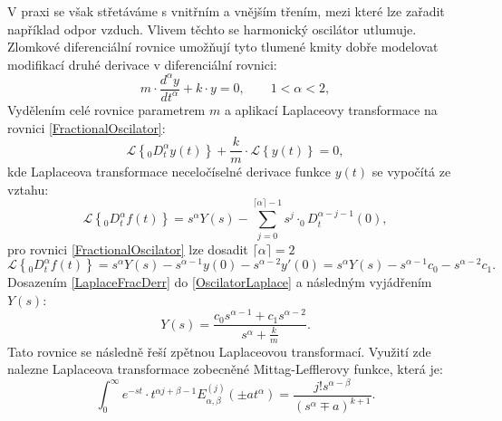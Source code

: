 \documentclass[a4paper,12pt,twoside]{article}
\theoremstyle{definition}
\theoremstyle{remark}
\numberwithin{equation}{section}
\numberwithin{table}{section}
\numberwithin{figure}{section}
\begin{document}
V praxi se však střetáváme s vnitřním a vnějším třením, mezi které lze zařadit například odpor vzduch. Vlivem těchto se harmonický oscilátor utlumuje. Zlomkové diferenciální rovnice umožňují tyto tlumené kmity dobře modelovat modifikací druhé derivace v diferenciální rovnici:
\begin{equation} \label{FractionalOscilator}
	m \cdot \frac{d^{\alpha} y}{d t^{\alpha}} + k \cdot y = 0, \qquad	1 < \alpha <2,
\end{equation}
Vydělením celé rovnice parametrem $m$ a aplikací Laplaceovy transformace na rovnici \eqref{FractionalOscilator}:
\begin{equation} \label{OscilatorLaplace}
	\mathcal{L} \left\lbrace_{0}D^{\alpha}_{t} y\left(t\right)\right\rbrace + \frac{k}{m} \cdot \mathcal{L} \left\lbrace y\left(t\right) \right\rbrace   = 0,
\end{equation}
kde Laplaceova transformace neceločíselné derivace funkce $y\left(t\right)$ se vypočítá ze vztahu:
\begin{equation} \label{LaplaceFracDerr}
	\mathcal{L} \left\lbrace_{0}D^{\alpha}_{t} f\left(t\right)\right\rbrace = s^{\alpha} Y\left(s\right)  - \sum_{j=0}^{\lceil\alpha\rceil-1} s^{j}\cdot _{0}D^{\alpha-j-1}_{t} \left(0\right),
\end{equation}
pro rovnici \eqref{FractionalOscilator} lze dosadit $\lceil \alpha \rceil = 2$
\begin{equation}
	\mathcal{L} \left\lbrace_{0}D^{\alpha}_{t} f\left(t\right)\right\rbrace = s^{\alpha} Y\left(s\right)  - 
	s^{\alpha - 1} y\left(0\right) -s^{\alpha - 2} y'\left(0\right) = s^{\alpha} Y\left(s\right)  - 
	s^{\alpha - 1} c_{0} -s^{\alpha - 2} c_{1}.
\end{equation}
Dosazením \eqref{LaplaceFracDerr} do \eqref{OscilatorLaplace} a následným vyjádřením $Y\left(s\right)$:
\begin{equation}\label{LaplaceRovniceHarmonickéhoOscilátoru}
	Y\left(s\right) = \frac{c_0 s^{\alpha-1} + c_{1} s^{\alpha - 2}}{s^{\alpha} + \frac{k}{m}}.
\end{equation}
Tato rovnice se následně řeší zpětnou Laplaceovou transformací. Využití zde nalezne Laplaceova transformace zobecněné Mittag-Lefflerovy funkce, která je:
\begin{equation} \label{LaplaceMittag-Lefler}
	\int_{0}^{\infty} e^{-st} \cdot t^{\alpha j +\beta -1} E_{\alpha,\beta}^{\left(j\right)} \left(\pm a t^{\alpha}\right) =\frac{j! s^{\alpha-\beta}}{\left(s^{\alpha} \mp a\right)^{k+1}}.
\end{equation}
\end{document}
